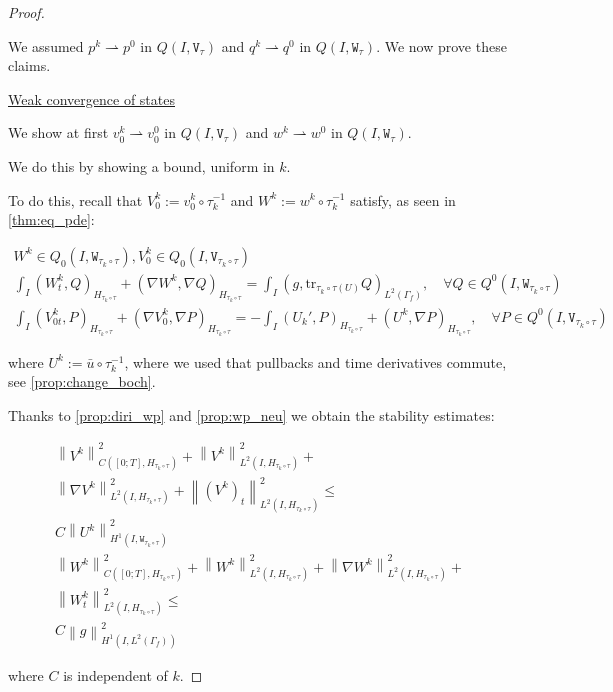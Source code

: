\documentclass[english,a4paper,9pt,oneside]{scrbook}	%
\theoremstyle{break}
\newenvironment{mproof}[1][\proofname]{%
  \begin{proof}[#1]$ $\par\nobreak\ignorespaces
}{%
  \end{proof}
}
\renewcommand*{\proofname}{Proof}
\theoremstyle{remark}
\newcommand{\norm}[1]{\left\lVert#1\right\rVert}
\newcommand{\tr}{\text{tr}}
\newcommand{\weakc}{\rightharpoonup}
\newcommand{\tw}[1]{\texttt{#1}}
\begin{document}
\begin{mproof}
We assumed $p^k \weakc p^0$ in $Q(I,\tw{V}_\tau)$ and $q^k \weakc q^0$ in $Q(I,\tw{W}_\tau)$. We now prove these claims.

\underline{Weak convergence of states}

We show at first  $v_0^k \weakc v^0_0$ in $Q(I,\tw{V}_\tau)$ and $w^k \weakc w^0$ in $Q(I,\tw{W}_\tau)$.

We do this by showing a bound, uniform in $k$.

To do this, recall that $V_0^k:=v_0^k\circ \tau_k^{-1}$ and $W^k:=w^k\circ \tau_k^{-1}$ satisfy, as seen in \cref{thm:eq_pde}:

\begin{align*}
W^k \in Q_0(I, \tw{W}_{\tau_k\circ \tau}), V_0^k \in Q_0(I,\tw{V}_{\tau_k\circ \tau}) \\
\int_I  (W^k_t , Q)_{H_{\tau_k\circ \tau}}+ (\nabla W^k, \nabla Q)_{H_{\tau_k\circ \tau}} = \int_I(g,\tr_{{\tau_k\circ \tau}(U)} Q)_{L^2(\Gamma_f)}, \quad \forall Q \in Q^0(I, \tw{W}_{\tau_k\circ \tau}) \\
\int_I (V^k_{0t},P)_{H_{\tau_k\circ \tau}} + (\nabla V_0^k, \nabla P)_{H_{\tau_k\circ \tau}}= -\int_I(U_k',P)_{H_{\tau_k\circ \tau}}+(U^k, \nabla P)_{H_{\tau_k\circ \tau}}, \quad \forall P \in Q^0(I, \tw{V}_{\tau_k\circ \tau})
\end{align*}

where $U^k:=\bar{u}\circ \tau_k^{-1}$, where we used that pullbacks and time derivatives commute, see \cref{prop:change_boch}.

Thanks to \cref{prop:diri_wp} and \cref{prop:wp_neu} we obtain the stability estimates:

\begin{align*}
\norm{V^k}^2_{C([0;T],H_{\tau_k\circ \tau})}+\norm{V^k}_{L^2(I,H_{\tau_k\circ \tau})}^2+ \\\norm{\nabla V^k}_{L^2(I,H_{\tau_k\circ \tau})}^2 + \norm{(V^k)_t}^2_{L^2(I,H_{\tau_k\circ \tau})}\leq\\ C\norm{U^k}_{H^1(I,\tw{W}_{\tau_k\circ \tau})}^2\\
\norm{W^k}^2_{C([0;T],H_{\tau_k\circ \tau})}+\norm{W^k}_{L^2(I,H_{\tau_k\circ \tau})}^2+ \norm{\nabla W^k}_{L^2(I,H_{\tau_k\circ \tau})}^2 +\\ \norm{W^k_t}^2_{L^2(I,H_{\tau_k\circ \tau})}\leq \\C\norm{g}_{H^1(I,L^2(\Gamma_f))}^2
\end{align*}


where $C$ is independent of $k$.



\end{mproof}
\end{document}
